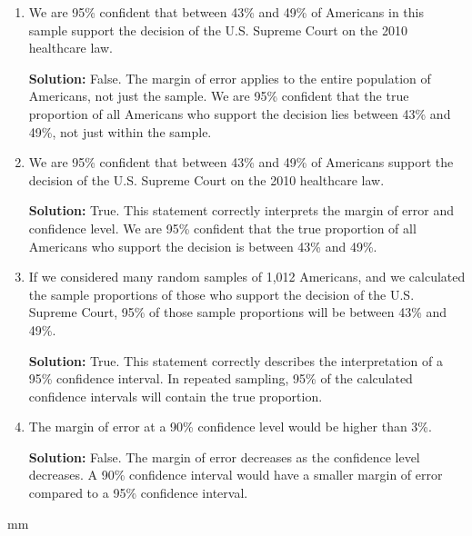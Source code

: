 \documentclass[12pt]{article}
\begin{document}
\begin{enumerate}
    \item  We are 95\% confident that between 43\% and 49\% of Americans in this sample support the decision of the U.S. Supreme Court on the 2010 healthcare law.

\textbf{Solution:}
False. The margin of error applies to the entire population of Americans, not just the sample. We are 95\% confident that the true proportion of all Americans who support the decision lies between 43\% and 49\%, not just within the sample.


    \item  We are 95\% confident that between 43\% and 49\% of Americans support the decision of the U.S. Supreme Court on the 2010 healthcare law.

\textbf{Solution:}
True. This statement correctly interprets the margin of error and confidence level. We are 95\% confident that the true proportion of all Americans who support the decision is between 43\% and 49\%.


\item  If we considered many random samples of 1,012 Americans, and we calculated the sample proportions of those who support the decision of the U.S. Supreme Court, 95\% of those sample proportions will be between 43\% and 49\%.

\textbf{Solution:}
True. This statement correctly describes the interpretation of a 95\% confidence interval. In repeated sampling, 95\% of the calculated confidence intervals will contain the true proportion.

\item The margin of error at a 90\% confidence level would be higher than 3\%.

\textbf{Solution:}
False. The margin of error decreases as the confidence level decreases. A 90\% confidence interval would have a smaller margin of error compared to a 95\% confidence interval.

\end{enumerate}

mm


 
\end{document}

